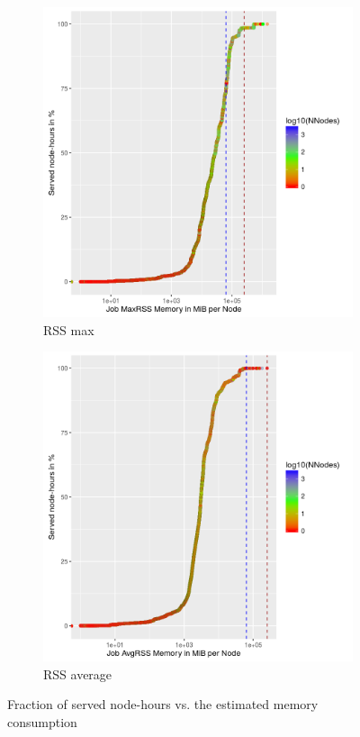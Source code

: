 \documentclass{../../template/esiwace-report}
\begin{document}
\begin{figure}
\begin{subfigure}[t]{0.49\textwidth}
\includegraphics[width=\textwidth]{mem-stats/systemComputeFractionRSS}
\caption{RSS max}
\label{fig:fracRSSMax}
\end{subfigure}
\begin{subfigure}[t]{0.49\textwidth}
\includegraphics[width=\textwidth]{mem-stats/systemComputeFractionRSSAVE}
\caption{RSS average}
\label{fig:fracRSSAvg}
\end{subfigure}
\caption{Fraction of served node-hours vs. the estimated memory consumption}
\label{fig:fractionMemConsumed}
\end{figure}
\end{document}
